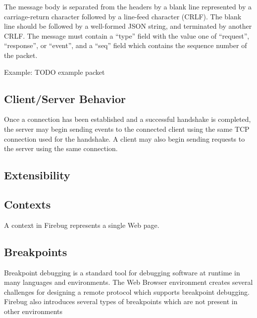 The message body is separated from the headers by a blank line
represented by a carriage-return character followed by a line-feed
character (CRLF).
The blank line should be followed by a well-formed JSON string, and terminated
by another CRLF. The message must contain a ``type'' field with the value one of
``request'', ``response'', or ``event'', and a ``seq'' field which contains the
sequence number of the packet.

Example:
TODO example packet

\subsection {Client/Server Behavior}
Once a connection has been established and a successful handshake is completed,
the server may begin sending events to the connected client using the same TCP
connection used for the handshake. A client may also begin sending requests to
the server using the same connection.

\subsection {Extensibility}

\subsection {Contexts}
A context in Firebug represents a single Web page.

\subsection {Breakpoints}
Breakpoint debugging is a standard tool for debugging software at runtime in
many languages and environments. The Web Browser environment creates several
challenges for designing a remote protocol which supports breakpoint debugging.
Firebug also introduces several types of breakpoints which are not present in
other environments \cite{jjb-www2010}
